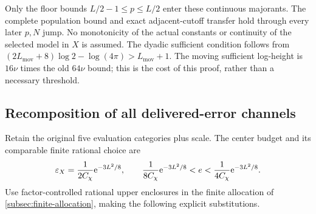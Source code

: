 Only the floor bounds \(L/2-1\le p\le L/2\) enter these continuous
majorants. The complete population bound and exact adjacent-cutoff
transfer hold through every later \(p,N\) jump. No monotonicity of the
actual constants or continuity of the selected model in \(X\) is assumed.
The dyadic sufficient condition follows from
\((2L_{\mathrm{mov}}+8)\log2-\log(4\pi)>L_{\mathrm{mov}}+1\).
The moving sufficient log-height is \(16\nu\) times the old \(64\nu\)
bound; this is the cost of this proof, rather than a necessary threshold.

\subsection{Recomposition of all delivered-error channels}
\label{subsec:moving-allocation}
Retain the original five evaluation categories plus scale. The center
budget and its comparable finite rational choice are
\begin{equation}
 \varepsilon_X=\frac{1}{2C_\chi}\mathrm e^{-3L^2/8},\qquad
 \frac{1}{8C_\chi}\mathrm e^{-3L^2/8}<e<
                  \frac{1}{4C_\chi}\mathrm e^{-3L^2/8}.
 \label{eq:moving-budget}
\end{equation}
Use factor-controlled rational upper enclosures in the finite allocation
of \cref{subsec:finite-allocation}, making the following explicit
substitutions.

